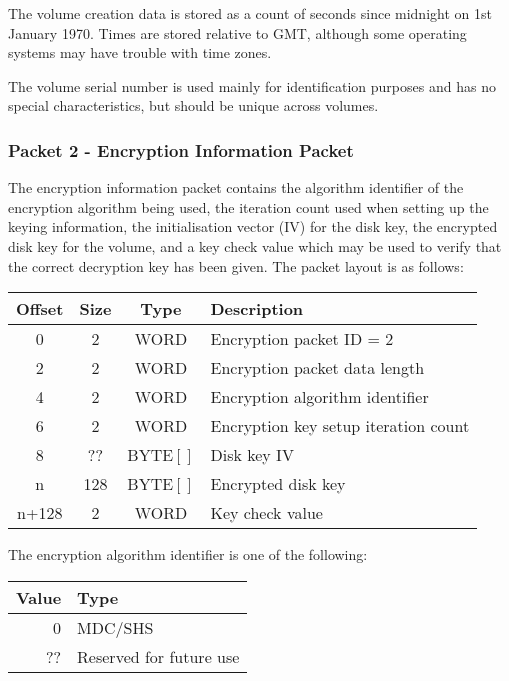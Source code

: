 The volume creation data is stored as a count of seconds since midnight on 1st
January 1970.  Times are stored relative to GMT, although some operating
systems may have trouble with time zones.

The volume serial number is used mainly for identification purposes and has no
special characteristics, but should be unique across volumes.


\subsubsection{Packet 2 - Encryption Information Packet}

The encryption information packet contains the algorithm identifier of the
encryption algorithm being used, the iteration count used when setting up the
keying information, the initialisation vector (IV) for the disk key, the
encrypted disk key for the volume, and a key check value which may be used to
verify that the correct decryption key has been given. The packet layout is as
follows:

\begin{center}
\begin{tabular}{|c|c|c|l|}
\hline
    Offset & Size &   Type    &    Description\\
\hline
       0   &   2  &   WORD    &    Encryption packet ID = 2\\
       2   &   2  &   WORD    &    Encryption packet data length\\
       4   &   2  &   WORD    &    Encryption algorithm identifier\\
       6   &   2  &   WORD    &    Encryption key setup iteration count\\
       8   &  ??  &   BYTE$[ ]$  &    Disk key IV\\
       n   & 128  &   BYTE$[ ]$  &    Encrypted disk key\\
   n+128   &   2  &   WORD    &    Key check value\\
\hline
\end{tabular}
\end{center}

The encryption algorithm identifier is one of the following:

\begin{center}
\begin{tabular}{|r|l|}
\hline
    Value &  Type\\
\hline
      0   &  MDC/SHS\\
     ??   &  Reserved for future use\\
\hline
\end{tabular}
\end{center}

